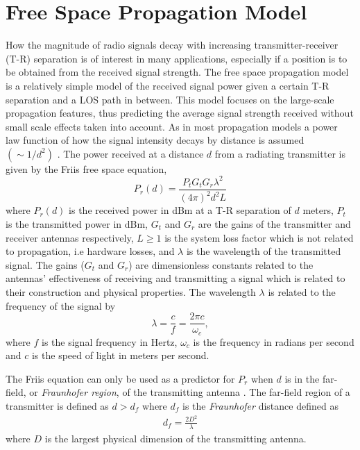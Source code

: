 \documentclass{LTHthesis}
\begin{document}
\section{Free Space Propagation Model}
%
How the magnitude of radio signals decay with increasing transmitter-receiver (T-R) separation is of interest in many applications, especially if a position is to be obtained from the received signal strength. The free space propagation model is a relatively simple model of the received signal power given a certain T-R separation and a LOS path in between. This model focuses on the large-scale propagation features, thus predicting the average signal strength received without small scale effects taken into account. As in most propagation models a power law function of how the signal intensity decays by distance is assumed $\left(\sim{1/d^2}\right)$ \cite{rappaport96}. The power received at a distance $d$ from a radiating transmitter is given by the Friis free space equation,
%
\begin{equation}
P_r(d)=\frac{P_tG_tG_r\lambda^2}{(4\pi)^2d^2L}\label{equation:friis_equation}
\end{equation}
%
where $P_r(d)$ is the received power in dBm at a T-R separation of $d$ meters, $P_t$ is the transmitted power in dBm, $G_t$ and $G_r$ are the gains of the transmitter and receiver antennas respectively, $L\geq1$ is the system loss factor which is not related to propagation, i.e hardware losses, and $\lambda$ is the wavelength of the transmitted signal. The gains ($G_t$ and $G_r$) are dimensionless constants related to the antennas' effectiveness of receiving and transmitting a signal which is related to their construction and physical properties. The wavelength $\lambda$ is related to the frequency of the signal by
\begin{equation}
\lambda=\frac{c}{f}=\frac{2\pi c}{\omega_c},
\end{equation} 
%
where $f$ is the signal frequency in Hertz, $\omega_c$ is the frequency in radians per second and $c$ is the speed of light in meters per second. 

The Friis equation can only be used as a predictor for $P_r$ when $d$ is in the far-field, or \emph{Fraunhofer region}, of the transmitting antenna \cite{rappaport96}. The far-field region of a transmitter is defined as $d>d_f$ where $d_f$ is the \emph{Fraunhofer} distance defined as
%
\begin{eqnarray}
d_f=\frac{2D^2}{\lambda}
\label{equation:frau_dist}
\end{eqnarray}
%
where $D$ is the largest physical dimension of the transmitting antenna.
\end{document}
